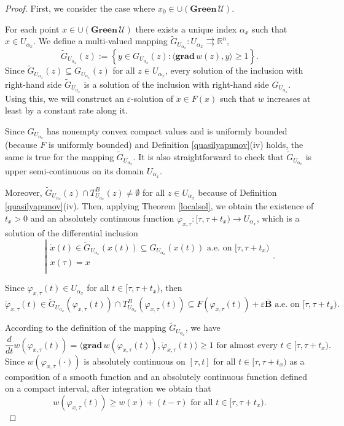 \documentclass[a4paper]{article}
\begin{document}
\begin{proof}
    First, we consider the case where $x_0 \in \cup(\mathbf{Green} \,\mathcal{U})$.

    For each point $x \in \cup(\mathbf{Green} \,\mathcal{U})$ there exists a unique index $\alpha_x$ such that $x \in U_{\alpha_x}$. We define a multi-valued mapping $\widetilde{G}_{U_{\alpha_x}} : U_{\alpha_x} \rightrightarrows \mathbb{R}^n$, $$\widetilde{G}_{U_{\alpha_x}} (z) := \left\{ y \in G_{U_{\alpha_x}}(z) : \langle \mathbf{grad} \,w(z), y \rangle \ge 1\right\}.$$
    Since $\widetilde{G}_{U_{\alpha_x}}(z) \subseteq G_{U_{\alpha_x}}(z)$ for all $z \in U_{\alpha_x}$, every solution of the inclusion with right-hand side $\widetilde{G}_{U_{\alpha_x}}$ is a solution of the inclusion with right-hand side $G_{U_{\alpha_x}}$. Using this, we will construct an $\varepsilon$-solution of $\dot{x} \in F(x)$ such that $w$ increases at least by a constant rate along it.

    Since $G_{U_{\alpha_x}}$ has nonempty convex compact values and is uniformly bounded (because $F$ is uniformly bounded) and Definition \ref{quasilyapunov}(iv) holds, the same is true for the mapping $\widetilde{G}_{U_{\alpha_x}}$. It is also straightforward to check that $\widetilde{G}_{U_{\alpha_x}}$ is upper semi-continuous on its domain $U_{\alpha_x}$.

    Moreover, $\widetilde{G}_{U_{\alpha_x}}(z) \cap T^B_{U_{\alpha_x}} (z) \ne \emptyset$ for all $z \in U_{\alpha_x}$ because of Definition \ref{quasilyapunov}(iv).
    Then, applying Theorem \ref{localsol}, we obtain the existence of $t_x >0$ and an absolutely continuous function $\varphi_{x,\tau} : [\tau,\tau+t_x) \to U_{\alpha_x}$, which is a solution of the differential inclusion
    $$\left| \begin{array}{l}
    \dot{x}(t) \in \widetilde{G}_{U_{\alpha_x}}(x(t)) \subseteq G_{U_{\alpha_x}}(x(t)) \text{ a.e. on } [\tau,\tau+t_x)\\
    x(\tau) = x\\
    \end{array} \right..$$

    Since $\varphi_{x,\tau}(t) \in U_{\alpha_x}$ for all $t \in [\tau,\tau+t_x)$, then
    $$\dot{\varphi}_{x,\tau}(t) \in \widetilde G_{U_{\alpha_x}}(\varphi_{x,\tau}(t)) \cap T^B_{U_{\alpha_x}} (\varphi_{x,\tau}(t)) \subseteq F(\varphi_{x,\tau}(t)) + \varepsilon \overline{\mathbf{B}} \text{ a.e. on } [\tau,\tau+t_x).$$

    According to the definition of the mapping $\widetilde{G}_{U_{\alpha_x}}$, we have
    $$\frac{d}{dt} w(\varphi_{x,\tau}(t)) = \langle \mathbf{grad} \,w(\varphi_{x,\tau}(t)), \dot{\varphi}_{x,\tau}(t) \rangle \ge 1 \text{ for almost every }t \in [\tau,\tau+t_x).$$
    Since $w(\varphi_{x,\tau}(\cdot))$ is absolutely continuous on $[\tau,t]$ for all $t \in [\tau,\tau + t_x)$ as a composition of a smooth function and an absolutely continuous function defined on a compact interval, after integration we obtain that $$w(\varphi_{x,\tau}(t)) \ge w(x) + (t-\tau) \text{ for all }t \in [\tau,\tau+t_x).$$


\end{proof}
\end{document}
